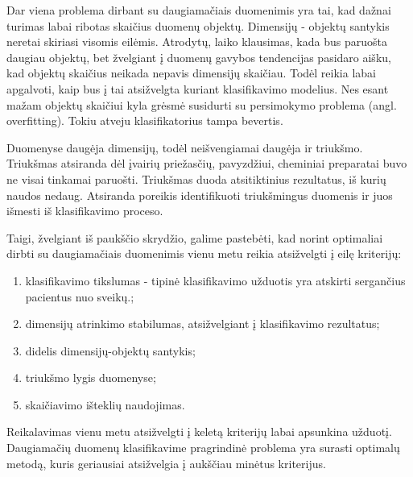 Dar viena problema dirbant su daugiamačiais duomenimis yra tai, kad dažnai
turimas labai ribotas skaičius duomenų objektų. Dimensijų - objektų santykis 
neretai skiriasi visomis eilėmis. Atrodytų, laiko klausimas, kada bus paruošta
daugiau objektų, bet žvelgiant į duomenų gavybos tendencijas pasidaro aišku, kad
objektų skaičius neikada nepavis dimensijų skaičiau. Todėl reikia labai apgalvoti,
kaip bus į tai atsižvelgta kuriant klasifikavimo modelius. Nes esant mažam
objektų skaičiui kyla grėsmė susidurti su persimokymo problema (angl. 
overfitting). Tokiu atveju klasifikatorius tampa bevertis.

Duomenyse daugėja dimensijų, todėl neišvengiamai daugėja ir triukšmo. 
Triukšmas atsiranda
dėl įvairių priežasčių, pavyzdžiui, cheminiai preparatai buvo ne visai tinkamai
paruošti. Triukšmas duoda atsitiktinius rezultatus, iš kurių naudos nedaug.
Atsiranda poreikis identifikuoti triukšmingus duomenis ir juos išmesti iš 
klasifikavimo proceso.

Taigi, žvelgiant iš paukščio skrydžio, galime pastebėti, kad norint optimaliai
dirbti su daugiamačiais duomenimis vienu metu reikia atsižvelgti į eilę kriterijų:
\begin{enumerate}
 \item klasifikavimo tikslumas - tipinė klasifikavimo užduotis yra atskirti
 sergančius pacientus nuo sveikų.;
 \item dimensijų atrinkimo stabilumas, atsižvelgiant į klasifikavimo rezultatus;
 \item didelis dimensijų-objektų santykis;
 \item triukšmo lygis duomenyse;
 \item skaičiavimo išteklių naudojimas.
\end{enumerate}
Reikalavimas vienu metu atsižvelgti į keletą kriterijų labai apsunkina užduotį.
Daugiamačių duomenų klasifikavime pragrindinė problema yra surasti optimalų 
metodą, kuris geriausiai atsižvelgia į aukščiau minėtus kriterijus.

